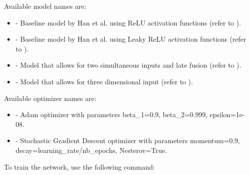 \documentclass[letterpaper,10pt,english]{sphinxmanual}
\begin{document}
Available model names are:
\begin{itemize}
\item {} 
 - Baseline model by Han et al. using ReLU activation functions (refer to ).

\item {} 
 - Baseline model by Han et al. using Leaky ReLU activation functions (refer to ).

\item {} 
 - Model that allows for two simultaneous inputs and late fusion (refer to ).

\item {} 
 - Model that allows for three dimensional input (refer to ).

\end{itemize}

Available optimizer names are:
\begin{itemize}
\item {} 
 - Adam optimizer with parameters beta\_1=0.9, beta\_2=0.999, epsilon=1e-08.

\item {} 
 - Stochastic Gradient Descent optimizer with parameters momentum=0.9, decay=learning\_rate/nb\_epochs, Nesterov=True.

\end{itemize}

To train the network, use the following command:

%
\begin{sphinxVerbatim}[commandchars=\\\{\}]
       
\end{sphinxVerbatim}
\end{document}
